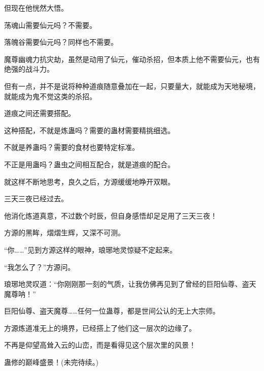 \begin{this_body}
但现在他恍然大悟。

荡魂山需要仙元吗？不需要。

落魄谷需要仙元吗？同样也不需要。

魔尊幽魂力抗灾劫，虽然是动用了仙元，催动杀招，但本质上他不需要仙元，也有绝强的战斗力。

但有一点，并不是说将种种道痕随意叠加在一起，只要量大，就能成为天地秘境，就能成为鬼不觉这类的杀招。

道痕之间还需要搭配。

这种搭配，不就是炼蛊吗？需要的蛊材需要精挑细选。

不就是养蛊吗？需要的食材也要特定标准。

不正是用蛊吗？蛊虫之间相互配合，就是道痕的配合。

就这样不断地思考，良久之后，方源缓缓地睁开双眼。

三天三夜已经过去。

他消化炼道真意，不过数个时辰，但自身感悟却足足用了三天三夜！

方源的黑眸，熠熠生辉，又深不可测。

“你……”见到方源这样的眼神，琅琊地灵惊疑不定起来。

“我怎么了？”方源问。

琅琊地灵叹道：“你刚刚那一刻的气质，让我仿佛再见到了曾经的巨阳仙尊、盗天魔尊呐！”

巨阳仙尊、盗天魔尊……任何一位蛊尊，都是世间公认的无上大宗师。

方源炼道准无上的境界，已经搭上了他们这一层次的边缘了。

不再是仰望高耸入云的山峦，而是看得见这个层次里的风景！

蛊修的巅峰盛景！(未完待续。)

\end{this_body}

